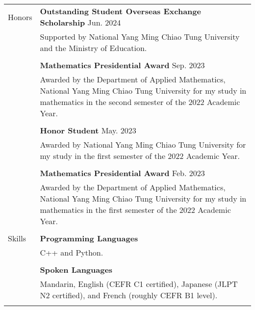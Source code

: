 \documentclass[letterpaper, 11pt]{article}
\begin{document}
\begin{center}
\begin{longtable}{p{0.76in}p{5.93in}}
        {\textcolor{OliveGreen}{Honors}} & \textbf{Outstanding Student Overseas Exchange Scholarship} \hfill Jun. 2024\\
        & Supported by National Yang Ming Chiao Tung University and the Ministry of Education. \\
        & \\
        & \textbf{Mathematics Presidential Award} \hfill Sep. 2023\\
        & Awarded by the Department of Applied Mathematics, National Yang Ming Chiao Tung University for my study in mathematics in the second semester of the 2022 Academic Year.\\
        & \\
        & \textbf{Honor Student} \hfill May. 2023\\
        & Awarded by National Yang Ming Chiao Tung University for my study in the first semester of the 2022 Academic Year. \\
        & \\
        & \textbf{Mathematics Presidential Award} \hfill Feb. 2023\\
        & Awarded by the Department of Applied Mathematics, National Yang Ming Chiao Tung University for my study in mathematics in the first semester of the 2022 Academic Year.\\
        & \\

        
        {\textcolor{OliveGreen}{Skills}} 
        & \textbf{Programming Languages}\\
        & C++ and Python.\\
        & \\

        & \textbf{Spoken Languages} \\
        & Mandarin, English (CEFR C1 certified), Japanese (JLPT N2 certified), and French (roughly CEFR B1 level).\\
        & \\
        

\end{longtable}
\end{center}
\end{document}
